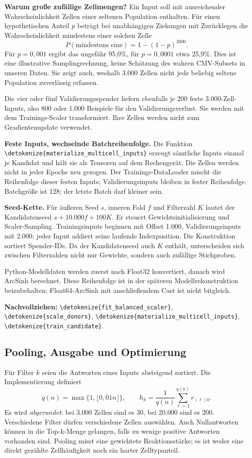 \documentclass[11pt,a4paper]{article}
\newcommand{\code}[1]{\expandafter\nolinkurl\expandafter{\detokenize{#1}}}
\newcommand{\source}[1]{\par{\footnotesize\raggedright\color{muted}\textbf{Nachvollziehen:} #1\par}}
\begin{document}
\textbf{Warum große zufällige Zellmengen?} Ein Input soll mit ausreichender
Wahrscheinlichkeit Zellen einer seltenen Population enthalten. Für einen
hypothetischen Anteil \(p\) beträgt bei unabhängigen Ziehungen mit Zurücklegen
die Wahrscheinlichkeit mindestens einer solchen Zelle
\[
 P(\text{mindestens eine})=1-(1-p)^{3000}.
\]
Für \(p=0{,}001\) ergibt das ungefähr 95,0\%, für \(p=0{,}0001\) etwa
25,9\%. Dies ist eine illustrative Samplingrechnung, keine Schätzung des
wahren CMV-Subsets in unseren Daten. Sie zeigt auch, weshalb 3.000 Zellen
nicht jede beliebig seltene Population zuverlässig erfassen.

Die vier oder fünf Validierungsspender liefern ebenfalls je 200 feste
3.000-Zell-Inputs, also 800 oder 1.000 Beispiele für den Validierungsverlust.
Sie werden mit dem Trainings-Scaler transformiert. Ihre Zellen werden
nicht zum Gradientenupdate verwendet.

\textbf{Feste Inputs, wechselnde Batchreihenfolge.} Die Funktion
\code{materialize_multicell_inputs} erzeugt sämtliche Inputs einmal je
Kandidat und hält sie als Tensoren auf dem Rechengerät. Die Zellen werden
nicht in jeder Epoche neu gezogen. Der Trainings-DataLoader mischt die
Reihenfolge dieser festen Inputs; Validierungsinputs bleiben in fester
Reihenfolge. Batchgröße ist 128; der letzte Batch darf kleiner sein.

\textbf{Seed-Kette.} Für äußeren Seed \(s\), inneren Fold \(f\) und
Filterzahl \(K\) lautet der Kandidatenseed \(s+10.000f+100K\).
Er steuert Gewichtsinitialisierung und Scaler-Sampling. Trainingsinputs
beginnen mit Offset 1.000, Validierungsinputs mit 2.000; jeder Input addiert
seine laufende Indexposition. Die Konstruktion sortiert Spender-IDs.
Da der Kandidatenseed auch \(K\) enthält, unterscheiden sich zwischen
Filterzahlen nicht nur Gewichte, sondern auch zufällige Stichproben.

Python-Modelldaten werden zuerst nach Float32 konvertiert, danach wird
ArcSinh berechnet. Diese Reihenfolge ist in der späteren Modellrekonstruktion
beizubehalten; Float64-ArcSinh mit anschließendem Cast ist nicht bitgleich.
\source{\code{fit_balanced_scaler}, \code{scale_donors},
\code{materialize_multicell_inputs}, \code{train_candidate}.}

\clearpage
\subsection*{Pooling, Ausgabe und Optimierung}
Für Filter \(k\) seien die Antworten eines Inputs absteigend sortiert.
Die Implementierung definiert
\[
 q(n)=\max\{1,\lfloor0{,}01n\rfloor\},\qquad
 h_k=\frac1{q(n)}\sum_{\ell=1}^{q(n)}r_{(\ell)k}.
\]
Es wird \emph{abgerundet}: bei 3.000 Zellen sind es 30, bei 20.000 sind
es 200. Verschiedene Filter dürfen verschiedene Zellen auswählen. Auch
Nullantworten können in die Top-k-Menge gelangen, falls zu wenige positive
Antworten vorhanden sind. Pooling misst eine gewichtete Reaktionsstärke;
es ist weder eine direkt gezählte Zellhäufigkeit noch ein harter Zelltypanteil.
\end{document}
